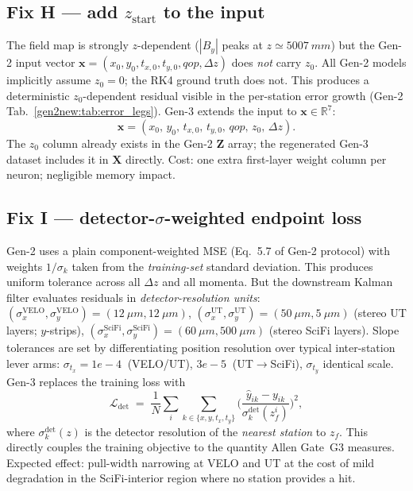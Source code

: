 \documentclass[a4paper,11pt]{article}
\newcommand{\SI}[2]{#1~#2}
\newcommand{\mm}{mm}
\newcommand{\dz}{\Delta z}
\newcommand{\loss}{\mathcal{L}}
\begin{document}
\subsection{Fix H --- add $z_\mathrm{start}$ to the input}

The field map is strongly $z$-dependent ($|B_y|$ peaks at
$z\simeq\SI{5007}{\mm}$) but the Gen-2 input vector
$\mathbf{x}=(x_0,y_0,t_{x,0},t_{y,0},qop,\dz)$ does \emph{not}
carry $z_0$.  All Gen-2 models implicitly assume $z_0=0$; the RK4
ground truth does not.  This produces a deterministic
$z_0$-dependent residual visible in the per-station error growth
(Gen-2 Tab.~\ref{gen2new:tab:error_legs}).  Gen-3 extends the input
to $\mathbf{x}\in\mathbb{R}^{7}$:
\begin{equation}
  \mathbf{x} = (x_0,\,y_0,\,t_{x,0},\,t_{y,0},\,qop,\,z_0,\,\dz).
\end{equation}
The $z_0$ column already exists in the Gen-2 $\mathbf{Z}$ array; the
regenerated Gen-3 dataset includes it in $\mathbf{X}$ directly.  Cost:
one extra first-layer weight column per neuron; negligible
memory impact.

\subsection{Fix I --- detector-$\sigma$-weighted endpoint loss}

Gen-2 uses a plain component-weighted MSE
(Eq.~5.7 of Gen-2 protocol) with weights $1/\sigma_k$ taken from the
\emph{training-set} standard deviation.  This produces uniform
tolerance across all $\dz$ and all momenta.  But the downstream
Kalman filter evaluates residuals in \emph{detector-resolution
units}:
$(\sigma^\mathrm{VELO}_x,\sigma^\mathrm{VELO}_y)=(\SI{12}{\mu m},\SI{12}{\mu m})$,
$(\sigma^\mathrm{UT}_x,\sigma^\mathrm{UT}_y)=(\SI{50}{\mu m},\SI{5}{\mu m})$ (stereo UT layers; $y$-strips),
$(\sigma^\mathrm{SciFi}_x,\sigma^\mathrm{SciFi}_y)=(\SI{60}{\mu m},\SI{500}{\mu m})$ (stereo SciFi layers).
Slope tolerances are set by differentiating position resolution over
typical inter-station lever arms: $\sigma_{t_x}=\SI{1e-4}{}$ (VELO/UT), $\SI{3e-5}{}$ (UT$\to$SciFi), $\sigma_{t_y}$ identical scale.
Gen-3 replaces the training loss with
\begin{equation}
  \loss_\mathrm{det}
  \;=\;
  \frac{1}{N}\sum_i \sum_{k\in\{x,y,t_x,t_y\}}
      \Big(\frac{\hat{y}_{ik} - y_{ik}}{\sigma^\mathrm{det}_k(z_f^i)}\Big)^{\!2},
  \label{eq:det_loss}
\end{equation}
where $\sigma^\mathrm{det}_k(z)$ is the detector resolution of the
\emph{nearest station} to $z_f$.  This directly couples the training
objective to the quantity Allen Gate~G3 measures.  Expected effect:
pull-width narrowing at VELO and UT at the cost of mild degradation
in the SciFi-interior region where no station provides a hit.
\end{document}
